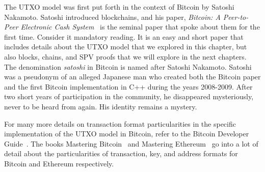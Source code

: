 The UTXO model was first put forth in the context of Bitcoin by Satoshi Nakamoto. Satoshi
introduced blockchains, and his paper, \emph{Bitcoin: A Peer-to-Peer Electronic Cash System}~\cite{bitcoin} is
the seminal paper that spoke about them for the first time. Consider it mandatory reading.
It is an easy and short paper that includes details about the UTXO model that we explored
in this chapter, but also blocks, chains, and SPV proofs that we will explore in the next chapters.
The denomination \emph{satoshi} in Bitcoin is named after Satoshi Nakamoto.
Satoshi was a pseudonym of an alleged Japanese man
who created both the Bitcoin paper and the first Bitcoin implementation in C++ during the years
2008-2009. After two short years of participation in the community, he disappeared mysteriously, never
to be heard from again. His identity remains a mystery.

For many more details on transaction format particularities in the specific implementation of the UTXO
model in Bitcoin, refer to the Bitcoin Developer Guide~\cite{bitcoin-dev-guide}.
The books Mastering Bitcoin~\cite{mastering-bitcoin} and Mastering Ethereum~\cite{mastering-ethereum}
go into a lot of detail about the particularities of transaction, key, and address formats
for Bitcoin and Ethereum respectively.

